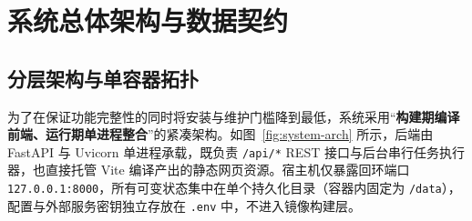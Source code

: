 \section{系统总体架构与数据契约}

\subsection{分层架构与单容器拓扑}

为了在保证功能完整性的同时将安装与维护门槛降到最低，系统采用“\textbf{构建期编译前端、运行期单进程整合}”的紧凑架构。如图~\ref{fig:system-arch} 所示，后端由 FastAPI 与 Uvicorn 单进程承载，既负责 \texttt{/api/*} REST 接口与后台串行任务执行器，也直接托管 Vite 编译产出的静态网页资源。宿主机仅暴露回环端口 \texttt{127.0.0.1:8000}，所有可变状态集中在单个持久化目录（容器内固定为 \texttt{/data}），配置与外部服务密钥独立存放在 \texttt{.env} 中，不进入镜像构建层。

